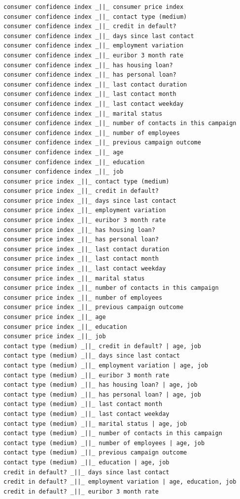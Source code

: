 \documentclass[11pt,]{article}
\begin{document}
\label{sec:initial_conditional_dependencies}
{\tiny\begin{verbatim}
consumer confidence index _||_ consumer price index
consumer confidence index _||_ contact type (medium)
consumer confidence index _||_ credit in default?
consumer confidence index _||_ days since last contact
consumer confidence index _||_ employment variation
consumer confidence index _||_ euribor 3 month rate
consumer confidence index _||_ has housing loan?
consumer confidence index _||_ has personal loan?
consumer confidence index _||_ last contact duration
consumer confidence index _||_ last contact month
consumer confidence index _||_ last contact weekday
consumer confidence index _||_ marital status
consumer confidence index _||_ number of contacts in this campaign
consumer confidence index _||_ number of employees
consumer confidence index _||_ previous campaign outcome
consumer confidence index _||_ age
consumer confidence index _||_ education
consumer confidence index _||_ job
consumer price index _||_ contact type (medium)
consumer price index _||_ credit in default?
consumer price index _||_ days since last contact
consumer price index _||_ employment variation
consumer price index _||_ euribor 3 month rate
consumer price index _||_ has housing loan?
consumer price index _||_ has personal loan?
consumer price index _||_ last contact duration
consumer price index _||_ last contact month
consumer price index _||_ last contact weekday
consumer price index _||_ marital status
consumer price index _||_ number of contacts in this campaign
consumer price index _||_ number of employees
consumer price index _||_ previous campaign outcome
consumer price index _||_ age
consumer price index _||_ education
consumer price index _||_ job
contact type (medium) _||_ credit in default? | age, job
contact type (medium) _||_ days since last contact
contact type (medium) _||_ employment variation | age, job
contact type (medium) _||_ euribor 3 month rate
contact type (medium) _||_ has housing loan? | age, job
contact type (medium) _||_ has personal loan? | age, job
contact type (medium) _||_ last contact month
contact type (medium) _||_ last contact weekday
contact type (medium) _||_ marital status | age, job
contact type (medium) _||_ number of contacts in this campaign
contact type (medium) _||_ number of employees | age, job
contact type (medium) _||_ previous campaign outcome
contact type (medium) _||_ education | age, job
credit in default? _||_ days since last contact
credit in default? _||_ employment variation | age, education, job
credit in default? _||_ euribor 3 month rate

\end{verbatim}}
\end{document}
